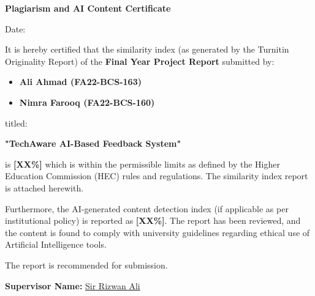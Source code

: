 
\newpage
\thispagestyle{empty}

\begin{center}
\textbf{\LARGE Plagiarism and AI Content Certificate}
\end{center}

\vspace{1cm}

\noindent
Date: \underline{\hspace{4cm}}

\vspace{1cm}

\noindent
It is hereby certified that the similarity index (as generated by the Turnitin 
Originality Report) of the \textbf{Final Year Project Report} 
submitted by:

\begin{itemize}
    \item \textbf{Ali Ahmad (FA22-BCS-163)}
    \item \textbf{Nimra Farooq (FA22-BCS-160)}
\end{itemize}

\noindent
titled:

\begin{center}
\textbf{"TechAware AI-Based Feedback System"}
\end{center}

\noindent
is \textbf{[XX\%]} which is within the permissible limits as defined by the 
Higher Education Commission (HEC) rules and regulations. The similarity index 
report is attached herewith.

\vspace{0.5cm}

\noindent
Furthermore, the AI-generated content detection index (if applicable as per 
institutional policy) is reported as \textbf{[XX\%]}. The report has been reviewed, 
and the content is found to comply with university guidelines regarding 
ethical use of Artificial Intelligence tools.

\vspace{0.5cm}

\noindent
The report is recommended for submission.

\vspace{2cm}

\noindent
\textbf{Supervisor Name:} \underline{Sir Rizwan Ali \hspace{4cm}}  

